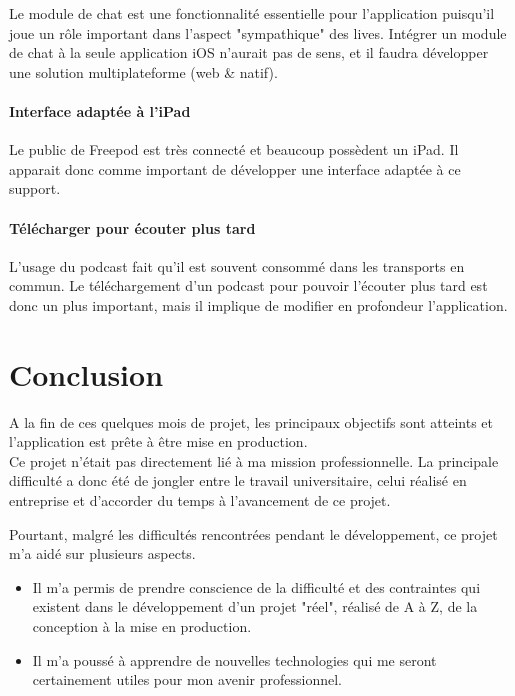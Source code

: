 \documentclass[11pt, french]{report}
\begin{document}
Le module de chat est une fonctionnalité essentielle pour l'application puisqu'il joue un rôle important dans l'aspect "sympathique" des lives. Intégrer un module de chat à la seule application iOS n'aurait pas de sens, et il faudra développer une solution multiplateforme (web \& natif).

\subsubsection{Interface adaptée à l'iPad}

Le public de Freepod est très connecté et beaucoup possèdent un iPad. Il apparait donc comme important de développer une interface adaptée à ce support.

\subsubsection{Télécharger pour écouter plus tard}

L'usage du podcast fait qu'il est souvent consommé dans les transports en commun. Le téléchargement d'un podcast pour pouvoir l'écouter plus tard est donc un plus important, mais il implique de modifier en profondeur l'application.


\chapter*{Conclusion}

A la fin de ces quelques mois de projet, les principaux objectifs sont atteints et l'application est prête à être mise en production.\\

Ce projet n'était pas directement lié à ma mission professionnelle. La principale difficulté a donc été de jongler entre le travail universitaire, celui réalisé en entreprise et d'accorder du temps à l'avancement de ce projet.

Pourtant, malgré les difficultés rencontrées pendant le développement, ce projet m'a aidé sur plusieurs aspects.
\begin{itemize}
	\item Il m'a permis de prendre conscience de la difficulté et des contraintes qui existent dans le développement d'un projet "réel", réalisé de A à Z, de la conception à la mise en production.
	\item Il m'a poussé à apprendre de nouvelles technologies qui me seront certainement utiles pour mon avenir professionnel.\\
\end{itemize}
\end{document}
